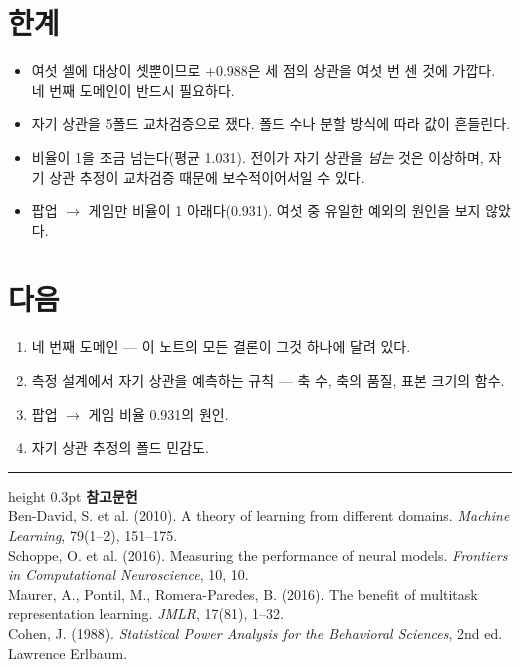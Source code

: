 \documentclass[10pt]{article}
\begin{document}
\section{한계}

\begin{itemize}[leftmargin=1.1em,itemsep=0.15em]
\item 여섯 셀에 대상이 셋뿐이므로 $+$0.988은 세 점의 상관을 여섯 번 센 것에 가깝다.
      네 번째 도메인이 반드시 필요하다.
\item 자기 상관을 5폴드 교차검증으로 쟀다. 폴드 수나 분할 방식에 따라 값이 흔들린다.
\item 비율이 1을 조금 넘는다(평균 1.031). 전이가 자기 상관을 \emph{넘는} 것은
      이상하며, 자기 상관 추정이 교차검증 때문에 보수적이어서일 수 있다.
\item 팝업 $\to$ 게임만 비율이 1 아래다(0.931). 여섯 중 유일한 예외의 원인을
      보지 않았다.
\end{itemize}

\section{다음}

\begin{enumerate}[leftmargin=1.3em,itemsep=0.15em]
\item 네 번째 도메인 --- 이 노트의 모든 결론이 그것 하나에 달려 있다.
\item 측정 설계에서 자기 상관을 예측하는 규칙 --- 축 수, 축의 품질, 표본 크기의 함수.
\item 팝업 $\to$ 게임 비율 0.931의 원인.
\item 자기 상관 추정의 폴드 민감도.
\end{enumerate}

\vspace{0.6em}
\hrule height 0.3pt
\vspace{0.5em}
{\footnotesize
\textbf{참고문헌}\\[0.3em]
Ben-David, S. et al. (2010). A theory of learning from different domains.
\emph{Machine Learning}, 79(1--2), 151--175.\\[0.15em]
Schoppe, O. et al. (2016). Measuring the performance of neural models.
\emph{Frontiers in Computational Neuroscience}, 10, 10.\\[0.15em]
Maurer, A., Pontil, M., Romera-Paredes, B. (2016). The benefit of multitask
representation learning. \emph{JMLR}, 17(81), 1--32.\\[0.15em]
Cohen, J. (1988). \emph{Statistical Power Analysis for the Behavioral Sciences},
2nd ed. Lawrence Erlbaum.
}
\end{document}
